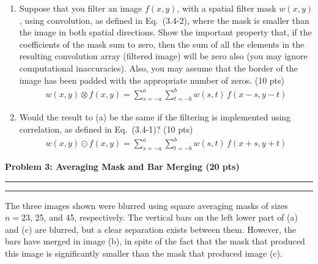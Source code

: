 \documentclass[12pt]{article}
\newcommand{\question}[1]{%
  \clearpage
  \vspace{0.5cm}
  {\noindent\normalsize \textbf{#1}}
  \vspace{0.2cm}
  \hrule
  \vspace{0.1cm}
  \hrule
  \vspace{0.3cm}
}
\begin{document}
\begin{enumerate}[label=(\alph*)]
\item Suppose that you filter an image $f(x,y)$, with a spatial filter mask $w(x,y)$, using convolution, as defined in Eq.~(3.4-2), where the mask is smaller than the image in both spatial directions. Show the important property that, if the coefficients of the mask sum to zero, then the sum of all the elements in the resulting convolution array (filtered image) will be zero also (you may ignore computational inaccuracies). Also, you may assume that the border of the image has been padded with the appropriate number of zeros. (10 pts)
\begin{align}
w(x,y) \otimes f(x,y) = \sum_{s=-a}^{a} \sum_{t=-b}^{b} w(s,t)\, f(x-s, y-t) \tag{3.4-2}
\end{align}

\item Would the result to (a) be the same if the filtering is implemented using correlation, as defined in Eq.~(3.4-1)? (10 pts)
\begin{align}
w(x,y) \odot f(x,y) = \sum_{s=-a}^{a} \sum_{t=-b}^{b} w(s,t)\, f(x+s, y+t) \tag{3.4-1}
\end{align}
\end{enumerate}



\question{Problem 3: Averaging Mask and Bar Merging (20 pts)}\label{quest:3}

The three images shown were blurred using square averaging masks of sizes $n=23$, 25, and 45, respectively. The vertical bars on the left lower part of (a) and (c) are blurred, but a clear separation exists between them. However, the bars have merged in image (b), in spite of the fact that the mask that produced this image is significantly smaller than the mask that produced image (c).

\vspace{0.5cm}
\end{document}
